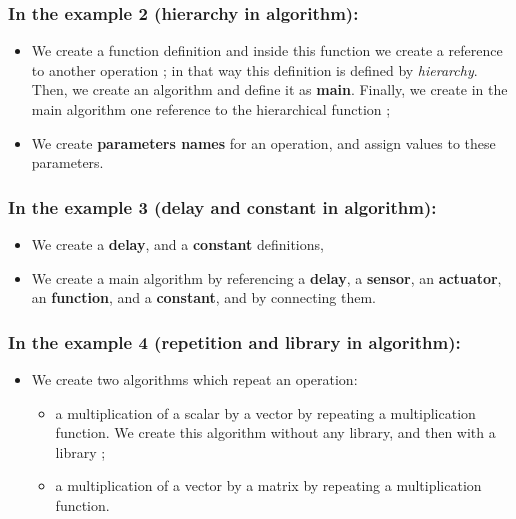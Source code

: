 \documentclass[a4paper,twoside]{report}
\begin{document}
\subsubsection{In the example 2 (hierarchy in algorithm):}
\begin{itemize}
\item We create a function definition and inside this function we create a
reference to another operation ; in that way this definition is defined by 
\textit{hierarchy}. Then,
we create an algorithm and define it as \textbf{main}. Finally, we create in
the main algorithm one reference to the hierarchical function ;

\item We create \textbf{parameters names} for an operation, and assign values
to these parameters.

\end{itemize}

\subsubsection{In the example 3 (delay and constant in algorithm):}
\begin{itemize}
\item We create a \textbf{delay}, and a \textbf{constant} definitions,

\item We create a main algorithm by referencing a \textbf{delay},
a \textbf{sensor}, an \textbf{actuator}, an \textbf{function}, and a
\textbf{constant}, and by connecting them.

\end{itemize}

\subsubsection{In the example 4 (repetition and library in algorithm):}
\begin{itemize}
\item We create two algorithms which repeat an operation:
\begin{itemize}
\item a multiplication of a scalar by a vector by repeating a multiplication
function. We create this algorithm without any library, and then with a library ;

\item a multiplication of a vector by a matrix by repeating a multiplication
function.
\end{itemize}

\end{itemize}
\end{document}
